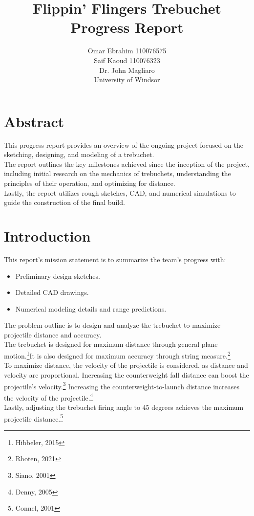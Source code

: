 \documentclass[12pt, titlepage]{article}
\title{Flippin' Flingers Trebuchet Progress Report}
\author{Omar Ebrahim 110076575\\Saif Kaoud 110076323\\[10pt] Dr. John Magliaro\\
University of Windsor}
\begin{document}
    \maketitle
    \section{Abstract}
    This progress report provides an overview of the ongoing project focused on the sketching, designing, and modeling of a trebuchet.\\[10pt]
    The report outlines the key milestones achieved since the inception of the project, 
    including initial research on the mechanics of trebuchets, understanding the principles of their operation,
    and optimizing for distance.\\[10pt]
    Lastly, the report utilizes rough sketches, CAD, and numerical simulations
    to guide the construction of the final build.
    \newpage
    \tableofcontents
    \listoffigures
    \newpage
    \section{Introduction}
    This report's mission statement is to summarize the team's progress with:
    \begin{itemize}
        \item Preliminary design sketches.
        \item Detailed CAD drawings.
        \item Numerical modeling details and range predictions.
    \end{itemize}
    The problem outline is to design and analyze the trebuchet to maximize
    projectile distance and accuracy.\\[10pt]
    The trebuchet is designed for maximum distance through general
    plane motion.\footnote{Hibbeler, 2015}It is also designed for maximum 
    accuracy through string measure.\footnote{Rhoten, 2021}\\[10pt]
    To maximize distance, the velocity of the projectile is considered, as
    distance and velocity are proportional. Increasing the counterweight 
    fall distance can boost the projectile's velocity.\footnote{Siano, 2001}
    Increasing the counterweight-to-launch distance increases the velocity 
    of the projectile.\footnote{Denny, 2005}\\[10pt]
    Lastly, adjusting the trebuchet firing angle to 
    45 degrees achieves the maximum projectile distance.\footnote{Connel, 2001}
    \newpage
\end{document}
